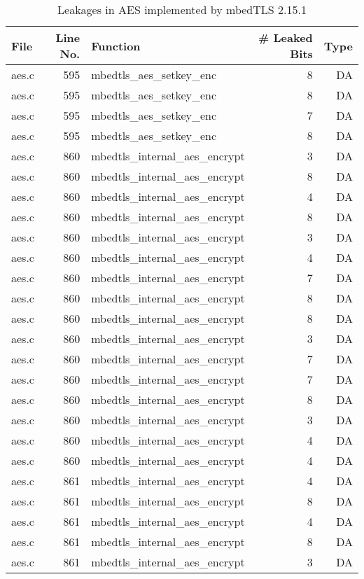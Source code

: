 \begin{table}[h!]
\centering\tiny\scriptsize
\caption{Leakages in AES implemented by mbedTLS 2.15.1}\label{tab:AESmbedTLS2.15.1}
\begin{tabular}{lrlrr}
\hline
\textbf{File} & \textbf{Line No.} & \textbf{Function} & \textbf{\# Leaked Bits} & \textbf{Type} \\\hline
aes.c& 595&mbedtls\_aes\_setkey\_enc&8 &DA\\
aes.c& 595&mbedtls\_aes\_setkey\_enc&8 &DA\\
aes.c& 595&mbedtls\_aes\_setkey\_enc&7 &DA\\
aes.c& 595&mbedtls\_aes\_setkey\_enc&8 &DA\\
aes.c& 860&mbedtls\_internal\_aes\_encrypt&3 &DA\\
aes.c& 860&mbedtls\_internal\_aes\_encrypt&8 &DA\\
aes.c& 860&mbedtls\_internal\_aes\_encrypt&4 &DA\\
aes.c& 860&mbedtls\_internal\_aes\_encrypt&8 &DA\\
aes.c& 860&mbedtls\_internal\_aes\_encrypt&3 &DA\\
aes.c& 860&mbedtls\_internal\_aes\_encrypt&4 &DA\\
aes.c& 860&mbedtls\_internal\_aes\_encrypt&7 &DA\\
aes.c& 860&mbedtls\_internal\_aes\_encrypt&8 &DA\\
aes.c& 860&mbedtls\_internal\_aes\_encrypt&8 &DA\\
aes.c& 860&mbedtls\_internal\_aes\_encrypt&3 &DA\\
aes.c& 860&mbedtls\_internal\_aes\_encrypt&7 &DA\\
aes.c& 860&mbedtls\_internal\_aes\_encrypt&7 &DA\\
aes.c& 860&mbedtls\_internal\_aes\_encrypt&8 &DA\\
aes.c& 860&mbedtls\_internal\_aes\_encrypt&3 &DA\\
aes.c& 860&mbedtls\_internal\_aes\_encrypt&4 &DA\\
aes.c& 860&mbedtls\_internal\_aes\_encrypt&4 &DA\\
aes.c& 861&mbedtls\_internal\_aes\_encrypt&4 &DA\\
aes.c& 861&mbedtls\_internal\_aes\_encrypt&8 &DA\\
aes.c& 861&mbedtls\_internal\_aes\_encrypt&4 &DA\\
aes.c& 861&mbedtls\_internal\_aes\_encrypt&8 &DA\\
aes.c& 861&mbedtls\_internal\_aes\_encrypt&3 &DA\\

\end{tabular}
\end{table}
